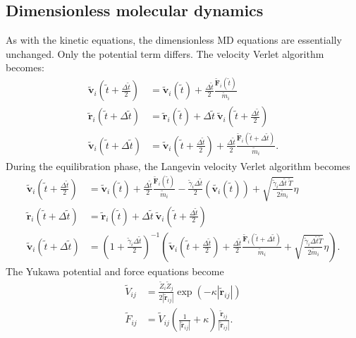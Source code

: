 \documentclass{article}
\begin{document}
\subsection{Dimensionless molecular dynamics}
As with the kinetic equations, the dimensionless MD equations are essentially unchanged. Only the potential term differs. The velocity Verlet algorithm becomes:
\begin{align*}
\tilde{\mathbf{v}}_i\left(\tilde{t}+\frac{\Delta\tilde{t}}{2}\right) &= \tilde{\mathbf{v}}_i(\tilde{t}) + \frac{\Delta\tilde{t}}{2}\frac{\tilde{\mathbf{F}}_i(\tilde{t})}{\tilde{m}_i} \\
\tilde{\mathbf{r}}_i(\tilde{t}+\Delta\tilde{t}) &= \tilde{\mathbf{r}}_i(\tilde{t}) + \Delta\tilde{t}\:\tilde{\mathbf{v}}_i\left(\tilde{t}+\frac{\Delta\tilde{t}}{2}\right) \\
\tilde{\mathbf{v}}_i(\tilde{t}+\Delta\tilde{t}) &= \tilde{\mathbf{v}}_i\left(\tilde{t}+\frac{\Delta\tilde{t}}{2}\right) + \frac{\Delta\tilde{t}}{2}\frac{\tilde{\mathbf{F}}_i(\tilde{t}+\Delta\tilde{t})}{\tilde{m}_i}.
\end{align*}
During the equilibration phase, the Langevin velocity Verlet algorithm becomes
\begin{align*}
\tilde{\mathbf{v}}_i\left(\tilde{t}+\frac{\Delta\tilde{t}}{2}\right) &= \tilde{\mathbf{v}}_i\left(\tilde{t}\right) + \frac{\Delta\tilde{t}}{2}\frac{\tilde{\mathbf{F}}_i\left(\tilde{t}\right)}{\tilde{m}_i} - \frac{\tilde{\gamma}_i\Delta\tilde{t}}{2}\left(\tilde{\mathbf{v}_i}\left(\tilde{t}\right)\right) + \sqrt{\frac{\tilde{\gamma}_i\Delta\tilde{t}\:\tilde{T}}{2\tilde{m}_i}}\eta \\
\tilde{\mathbf{r}}_i\left(\tilde{t}+\Delta\tilde{t}\right) &= \tilde{\mathbf{r}}_i\left(\tilde{t}\right) + \Delta\tilde{t}\:\tilde{\mathbf{v}}_i\left(\tilde{t}+\frac{\Delta\tilde{t}}{2}\right) \\
\tilde{\mathbf{v}}_i\left(\tilde{t}+\Delta\tilde{t}\right) &= \left(1+\frac{\tilde{\gamma}_i\Delta\tilde{t}}{2}\right)^{-1} \left(\tilde{\mathbf{v}}_i\left(\tilde{t}+\frac{\Delta\tilde{t}}{2}\right) + \frac{\Delta\tilde{t}}{2}\frac{\tilde{\mathbf{F}}_i\left(\tilde{t}+\Delta\tilde{t}\right)}{\tilde{m}_i} + \sqrt{\frac{\tilde{\gamma}_i\Delta\tilde{t}\tilde{T}}{2\tilde{m}_i}}\eta\right).
\end{align*}
The Yukawa potential and force equations become
\begin{align*}
\tilde{V}_{ij} &= \frac{\tilde{Z}_i\tilde{Z}_j}{2|\tilde{\mathbf{r}}_{ij}|} \exp\left(-\kappa|\tilde{\mathbf{r}}_{ij}|\right) \\
\tilde{F}_{ij} &= \tilde{V}_{ij} \left(\frac{1}{|\tilde{\mathbf{r}}_{ij}|} + \kappa\right)\frac{\tilde{\mathbf{r}}_{ij}}{|\tilde{\mathbf{r}}_{ij}|}.
\end{align*}
\end{document}
